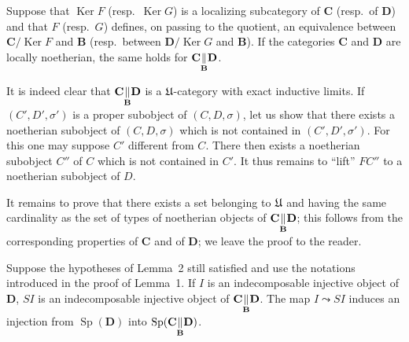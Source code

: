 \begin{lemma}
Suppose that $\operatorname{Ker} F$ (resp.\ $\operatorname{Ker} G$) is a
localizing subcategory of $\mathbf{C}$ (resp.\ of $\mathbf{D}$) and that
$F$ (resp.\ $G$) defines, on passing to the quotient, an equivalence
between $\mathbf{C}/\operatorname{Ker} F$ and $\mathbf{B}$ (resp.\
between $\mathbf{D}/\operatorname{Ker} G$ and $\mathbf{B}$). If the
categories $\mathbf{C}$ and $\mathbf{D}$ are locally noetherian, the
same holds for
$\mathbf{C} \underset{\mathbf{B}}{\Vert} \mathbf{D}$.
\end{lemma}

It is indeed clear that
$\mathbf{C} \underset{\mathbf{B}}{\Vert} \mathbf{D}$ is a $\mathfrak{U}$-category
with exact inductive limits. If $(C', D', \sigma')$ is a proper
subobject of $(C, D, \sigma)$, let us show that there exists a
noetherian subobject of $(C, D, \sigma)$ which is not contained in
$(C', D', \sigma')$. For this one may suppose $C'$ different from $C$.
There then exists a noetherian subobject $C''$ of $C$ which is not
contained in $C'$. It thus remains to ``lift'' $FC''$ to a noetherian
subobject of $D$.

It remains to prove that there exists a set belonging to $\mathfrak{U}$ and
having the same cardinality as the set of types of noetherian objects of
$\mathbf{C} \underset{\mathbf{B}}{\Vert} \mathbf{D}$; this follows from the
corresponding properties of $\mathbf{C}$ and of $\mathbf{D}$; we leave
the proof to the reader.

Suppose the hypotheses of Lemma~2 still satisfied and use the notations
introduced in the proof of Lemma~1. If $I$ is an indecomposable
injective object of $\mathbf{D}$, $SI$ is an indecomposable injective
object of $\mathbf{C} \underset{\mathbf{B}}{\Vert} \mathbf{D}$. The map
$I \leadsto SI$ induces an injection from $\operatorname{Sp}(\mathbf{D})$
into
$\operatorname{Sp}(\mathbf{C} \underset{\mathbf{B}}{\Vert} \mathbf{D})$.

